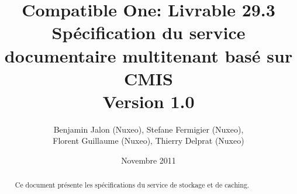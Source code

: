\documentclass[a4paper,11pt]{article}
\title{Compatible One: Livrable 29.3\\
Spécification du service documentaire multitenant basé sur CMIS\\
Version 1.0}
\date{Novembre 2011}
\author{Benjamin Jalon (Nuxeo), Stefane Fermigier (Nuxeo),\\
Florent Guillaume (Nuxeo), Thierry Delprat (Nuxeo)}
\begin{document}
\maketitle
\begin{abstract}
  Ce document présente les spécifications du service de stockage et de caching.
\end{abstract}

\tableofcontents

\pagebreak


\end{document}
